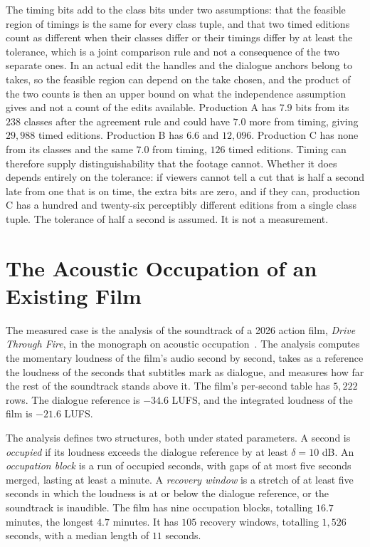 \documentclass[11pt,twoside,openright]{book}
\theoremstyle{plain}
\theoremstyle{definition}
\theoremstyle{remark}
\begin{document}
The timing bits add to the class bits under two assumptions: that the feasible region of timings is the same for every class tuple, and that two timed editions count as different when their classes differ or their timings differ by at least the tolerance, which is a joint comparison rule and not a consequence of the two separate ones. In an actual edit the handles and the dialogue anchors belong to takes, so the feasible region can depend on the take chosen, and the product of the two counts is then an upper bound on what the independence assumption gives and not a count of the edits available. Production A has $7.9$ bits from its $238$ classes after the agreement rule and could have $7.0$ more from timing, giving $29{,}988$ timed editions. Production B has $6.6$ and $12{,}096$. Production C has none from its classes and the same $7.0$ from timing, $126$ timed editions. Timing can therefore supply distinguishability that the footage cannot. Whether it does depends entirely on the tolerance: if viewers cannot tell a cut that is half a second late from one that is on time, the extra bits are zero, and if they can, production C has a hundred and twenty-six perceptibly different editions from a single class tuple. The tolerance of half a second is assumed. It is not a measurement.

\section{The Acoustic Occupation of an Existing Film}\label{sec:occupation}

The measured case is the analysis of the soundtrack of a 2026 action film, \emph{Drive Through Fire}, in the monograph on acoustic occupation~\cite{flyxion2026ao}. The analysis computes the momentary loudness of the film's audio second by second, takes as a reference the loudness of the seconds that subtitles mark as dialogue, and measures how far the rest of the soundtrack stands above it. The film's per-second table has $5{,}222$ rows. The dialogue reference is $-34.6$ LUFS, and the integrated loudness of the film is $-21.6$ LUFS.

The analysis defines two structures, both under stated parameters. A second is \emph{occupied} if its loudness exceeds the dialogue reference by at least $\delta=10$ dB. An \emph{occupation block} is a run of occupied seconds, with gaps of at most five seconds merged, lasting at least a minute. A \emph{recovery window} is a stretch of at least five seconds in which the loudness is at or below the dialogue reference, or the soundtrack is inaudible. The film has nine occupation blocks, totalling $16.7$ minutes, the longest $4.7$ minutes. It has $105$ recovery windows, totalling $1{,}526$ seconds, with a median length of $11$ seconds.
\end{document}
